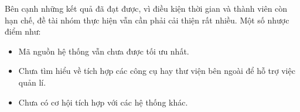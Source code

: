 Bên cạnh những kết quả đã đạt được, vì điều kiện thời gian và thành viên còn hạn chế, đề tài nhóm thực hiện vẫn cần phải cải thiện rất nhiều. Một số nhược điểm như:
\begin{itemize}
    \item Mã nguồn hệ thống vẫn chưa được tối ưu nhất.
    \item Chưa tìm hiểu về tích hợp các công cụ hay thư viện bên ngoài để hỗ trợ việc quản lí.
    \item Chưa có cơ hội tích hợp với các hệ thống khác.
\end{itemize}